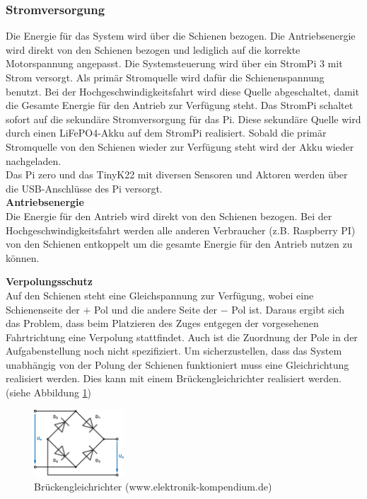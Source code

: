 \documentclass[../../main.tex]{subfiles}
\begin{document}
    \subsubsection{Stromversorgung} \label{et_stromversorgung}
    Die Energie für das System wird über die Schienen bezogen. Die Antriebsenergie wird direkt von den Schienen bezogen und lediglich auf die korrekte Motorspannung angepasst. Die
    Systemsteuerung wird über ein StromPi 3 mit Strom versorgt. Als primär Stromquelle wird dafür die Schienenspannung
    benutzt. Bei der Hochgeschwindigkeitsfahrt wird diese Quelle abgeschaltet, damit die Gesamte Energie für den Antrieb
    zur Verfügung steht. Das StromPi schaltet sofort auf die sekundäre Stromversorgung für das Pi. Diese sekundäre
    Quelle wird durch einen LiFePO4-Akku auf dem StromPi realisiert. Sobald die primär Stromquelle von den Schienen
    wieder zur Verfügung steht wird der Akku wieder nachgeladen.\\
    Das Pi zero und das TinyK22 mit diversen Sensoren und Aktoren werden über die USB-Anschlüsse des Pi versorgt.\\

    \textbf{Antriebsenergie}\\
    Die Energie für den Antrieb wird direkt von den Schienen bezogen. Bei der Hochgeschwindigkeitsfahrt werden alle anderen Verbraucher (z.B. Raspberry PI) von den Schienen entkoppelt um die gesamte Energie für den Antrieb nutzen zu können.

    \textbf{Verpolungsschutz}\\
    Auf den Schienen steht eine Gleichspannung zur Verfügung, wobei eine Schienenseite der $+$ Pol und die andere Seite der $-$ Pol ist. Daraus ergibt sich das Problem, dass beim Platzieren des Zuges entgegen der vorgesehenen Fahrtrichtung eine Verpolung stattfindet. Auch ist die Zuordnung der Pole in der Aufgabenstellung noch nicht spezifiziert. Um sicherzustellen, dass das System unabhängig von der Polung der Schienen funktioniert muss eine Gleichrichtung realisiert werden. Dies kann mit einem Brückengleichrichter realisiert werden. (siehe Abbildung \ref{fig:et_bruckengleichrichter})

    \begin{figure}[H]
        \centering
        \includegraphics[width=0.3\textwidth]{Brueckengleichrichter.png}
        \caption {Brückengleichrichter (www.elektronik-kompendium.de)}
        \label{fig:et_bruckengleichrichter}
    \end{figure}
\end{document}
